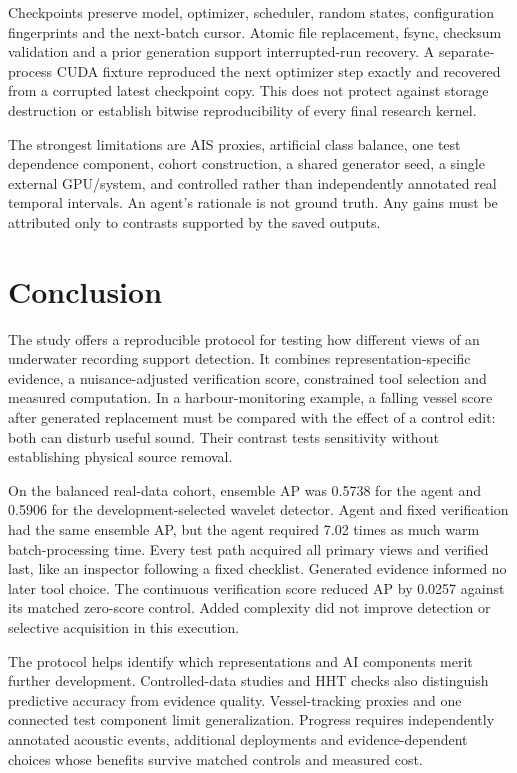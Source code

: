 \documentclass[11pt,letterpaper]{article}
\begin{document}
Checkpoints preserve model, optimizer, scheduler, random states, configuration fingerprints and the next-batch cursor. Atomic file replacement, fsync, checksum validation and a prior generation support interrupted-run recovery. A separate-process CUDA fixture reproduced the next optimizer step exactly and recovered from a corrupted latest checkpoint copy. This does not protect against storage destruction or establish bitwise reproducibility of every final research kernel.\par

The strongest limitations are AIS proxies, artificial class balance, one test dependence component, cohort construction, a shared generator seed, a single external GPU/system, and controlled rather than independently annotated real temporal intervals. An agent's rationale is not ground truth. Any gains must be attributed only to contrasts supported by the saved outputs.\par

\clearpage

\section{Conclusion}

The study offers a reproducible protocol for testing how different views of an underwater recording support detection. It combines representation-specific evidence, a nuisance-adjusted verification score, constrained tool selection and measured computation. In a harbour-monitoring example, a falling vessel score after generated replacement must be compared with the effect of a control edit: both can disturb useful sound. Their contrast tests sensitivity without establishing physical source removal.\par

On the balanced real-data cohort, ensemble AP was 0.5738 for the agent and 0.5906 for the development-selected wavelet detector. Agent and fixed verification had the same ensemble AP, but the agent required 7.02 times as much warm batch-processing time. Every test path acquired all primary views and verified last, like an inspector following a fixed checklist. Generated evidence informed no later tool choice. The continuous verification score reduced AP by 0.0257 against its matched zero-score control. Added complexity did not improve detection or selective acquisition in this execution.\par

The protocol helps identify which representations and AI components merit further development. Controlled-data studies and HHT checks also distinguish predictive accuracy from evidence quality. Vessel-tracking proxies and one connected test component limit generalization. Progress requires independently annotated acoustic events, additional deployments and evidence-dependent choices whose benefits survive matched controls and measured cost.\par

{\fontsize{9}{11}\selectfont





}
\end{document}
